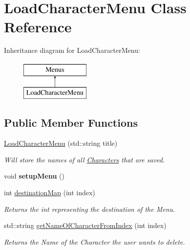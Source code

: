 \hypertarget{class_load_character_menu}{}\section{Load\+Character\+Menu Class Reference}
\label{class_load_character_menu}
Inheritance diagram for Load\+Character\+Menu\+:\begin{figure}[H]
\begin{center}
\leavevmode
\includegraphics[height=2.000000cm]{class_load_character_menu}
\end{center}
\end{figure}
\subsection*{Public Member Functions}
\begin{DoxyCompactItemize}
\item 
\hyperlink{class_load_character_menu_a22e8fd19aa9a5145b4e1fdb136b8e735}{Load\+Character\+Menu} (std\+::string title)
\begin{DoxyCompactList}\small\item\em Will store the names of all \hyperlink{class_characters}{Characters} that are saved. \end{DoxyCompactList}\item 
\hypertarget{class_load_character_menu_a1d4a8593bdc60a40bdcf1631185fef96}{}\label{class_load_character_menu_a1d4a8593bdc60a40bdcf1631185fef96} 
void {\bfseries setup\+Menu} ()
\item 
\hypertarget{class_load_character_menu_adeae3c03ce73a18615db6402d02c2da7}{}\label{class_load_character_menu_adeae3c03ce73a18615db6402d02c2da7} 
int \hyperlink{class_load_character_menu_adeae3c03ce73a18615db6402d02c2da7}{destination\+Map} (int index)
\begin{DoxyCompactList}\small\item\em Returns the int representing the destination of the Menu. \end{DoxyCompactList}\item 
\hypertarget{class_load_character_menu_a87a656590efcc42cfda89a3310e5bdf2}{}\label{class_load_character_menu_a87a656590efcc42cfda89a3310e5bdf2} 
std\+::string \hyperlink{class_load_character_menu_a87a656590efcc42cfda89a3310e5bdf2}{get\+Name\+Of\+Character\+From\+Index} (int index)
\begin{DoxyCompactList}\small\item\em Returns the Name of the Character the user wants to delete. \end{DoxyCompactList}\end{DoxyCompactItemize}
